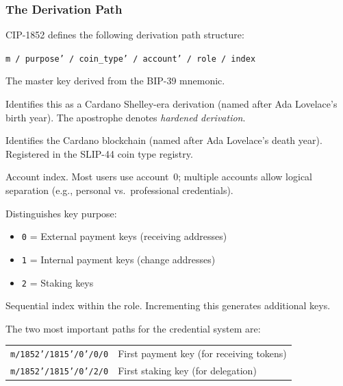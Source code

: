\subsubsection{The Derivation Path}

CIP-1852 defines the following derivation path structure:

\begin{center}
\texttt{m / purpose' / coin\_type' / account' / role / index}
\end{center}

\begin{description}[nosep, leftmargin=1.5em]
  \item[\texttt{m}] The master key derived from the BIP-39 mnemonic.
  \item[\texttt{purpose' = 1852'}] Identifies this as a Cardano Shelley-era
    derivation (named after Ada Lovelace's birth year).  The apostrophe
    denotes \emph{hardened derivation}.
  \item[\texttt{coin\_type' = 1815'}] Identifies the Cardano blockchain
    (named after Ada Lovelace's death year).  Registered in the SLIP-44
    coin type registry.
  \item[\texttt{account' = 0'}] Account index.  Most users use account~0;
    multiple accounts allow logical separation (e.g., personal vs.\
    professional credentials).
  \item[\texttt{role}] Distinguishes key purpose:
    \begin{itemize}[nosep]
      \item \texttt{0} = External payment keys (receiving addresses)
      \item \texttt{1} = Internal payment keys (change addresses)
      \item \texttt{2} = Staking keys
    \end{itemize}
  \item[\texttt{index}] Sequential index within the role.  Incrementing
    this generates additional keys.
\end{description}

The two most important paths for the credential system are:

\begin{center}
\begin{tabular}{ll}
  \texttt{m/1852'/1815'/0'/0/0} & First payment key (for receiving tokens) \\
  \texttt{m/1852'/1815'/0'/2/0} & First staking key (for delegation) \\
\end{tabular}
\end{center}

